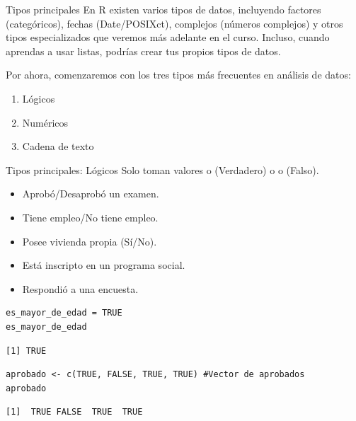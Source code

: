 \documentclass[8pt]{beamer}
\begin{document}
\begin{frame}[fragile]{Tipos principales}
	En R existen varios tipos de datos, incluyendo factores (categóricos), fechas (Date/POSIXct), complejos (números complejos) y otros tipos especializados que veremos más adelante en el curso. Incluso, cuando aprendas a usar listas, podr\'ias crear tus propios tipos de datos.
	
	Por ahora, comenzaremos con los tres tipos más frecuentes en análisis de datos:
	
	\begin{enumerate}
		\item L\'ogicos
		\item Num\'ericos
		\item Cadena de texto
	\end{enumerate}
\end{frame}







\begin{frame}[fragile]{Tipos principales: Lógicos}
	Solo toman valores  o  (Verdadero) o  o  (Falso).
	
	\begin{itemize}
		\item Aprobó/Desaprobó un examen. 
		\item Tiene empleo/No tiene empleo. 
		\item Posee vivienda propia (Sí/No). 
		\item Está inscripto en un programa social. 
		\item Respondió a una encuesta.
	\end{itemize}
\end{frame}







\begin{frame}[fragile]
\begin{lstlisting}[style=RScript]
es_mayor_de_edad = TRUE
es_mayor_de_edad
\end{lstlisting}
\begin{lstlisting}[style=RConsole]
[1] TRUE
\end{lstlisting}
\begin{lstlisting}[style=RScript]
aprobado <- c(TRUE, FALSE, TRUE, TRUE) #Vector de aprobados
aprobado
\end{lstlisting}
\begin{lstlisting}[style=RConsole]
[1]  TRUE FALSE  TRUE  TRUE
\end{lstlisting}
\end{frame}
\end{document}
